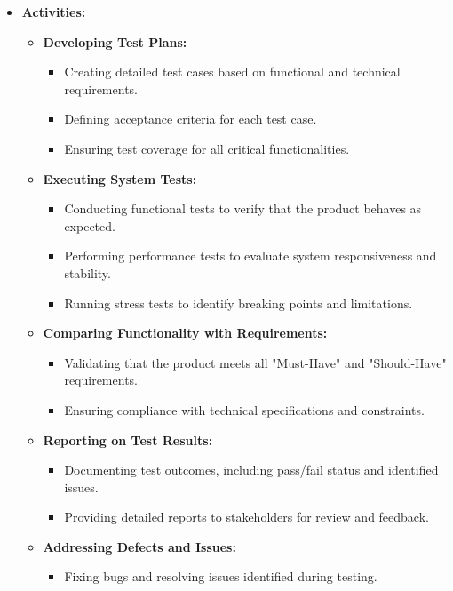 \documentclass{article}
\begin{document}
\begin{itemize}[leftmargin=*, label={}]
    \item \textbf{Activities:}
    \begin{itemize}
        \item \textbf{Developing Test Plans:}
        \begin{itemize}
            \item Creating detailed test cases based on functional and technical requirements.
            \item Defining acceptance criteria for each test case.
            \item Ensuring test coverage for all critical functionalities.
        \end{itemize}
        \item \textbf{Executing System Tests:}
        \begin{itemize}
            \item Conducting functional tests to verify that the product behaves as expected.
            \item Performing performance tests to evaluate system responsiveness and stability.
            \item Running stress tests to identify breaking points and limitations.
        \end{itemize}
        \item \textbf{Comparing Functionality with Requirements:}
        \begin{itemize}
            \item Validating that the product meets all "Must-Have" and "Should-Have" requirements.
            \item Ensuring compliance with technical specifications and constraints.
        \end{itemize}
        \item \textbf{Reporting on Test Results:}
        \begin{itemize}
            \item Documenting test outcomes, including pass/fail status and identified issues.
            \item Providing detailed reports to stakeholders for review and feedback.
        \end{itemize}
        \item \textbf{Addressing Defects and Issues:}
        \begin{itemize}
            \item Fixing bugs and resolving issues identified during testing.

\end{itemize}
\end{itemize}
\end{itemize}
\end{document}
